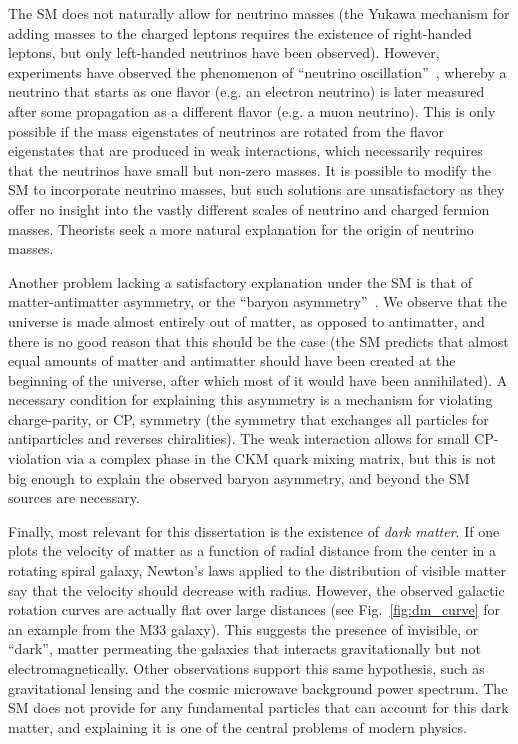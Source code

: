 The SM does not naturally allow for neutrino masses (the Yukawa mechanism for adding masses to the charged leptons
requires the existence of right-handed leptons, but only left-handed neutrinos have been observed). However,
experiments have observed the phenomenon of ``neutrino oscillation''~\cite{PDGreview14}, whereby a neutrino that
starts as one flavor (e.g. an electron neutrino) is later measured after some propagation as a different flavor
(e.g. a muon neutrino). This is only possible if the mass eigenstates of neutrinos are rotated from the flavor
eigenstates that are produced in weak interactions, which necessarily requires that the neutrinos have small
but non-zero masses. It is possible to modify the SM to incorporate neutrino masses, but such solutions are
unsatisfactory as they offer no insight into the vastly different scales of neutrino and charged fermion masses.
Theorists seek a more natural explanation for the origin of neutrino masses.

Another problem lacking a satisfactory explanation under the SM is that of matter-antimatter asymmetry, 
or the ``baryon asymmetry''~\cite{Canetti:baryon_asymm}. 
We observe that the universe is made almost entirely out of matter, as opposed
to antimatter, and there is no good reason that this should be the case (the SM predicts that almost equal amounts
of matter and antimatter should have been created at the beginning of the universe, after which most of it
would have been annihilated). A necessary condition for explaining this asymmetry is a mechanism for violating
charge-parity, or CP, symmetry (the symmetry that exchanges all particles for antiparticles and reverses chiralities).
The weak interaction allows for small CP-violation via a complex phase in the CKM quark mixing matrix, but this
is not big enough to explain the observed baryon asymmetry, and beyond the SM sources are necessary.

Finally, most relevant for this dissertation is the existence of \textit{dark matter}. If one plots the velocity of
matter as a function of radial distance from the center in a rotating spiral galaxy, Newton's laws
applied to the distribution of visible matter say that the velocity should decrease with radius. However, the observed 
galactic rotation curves are actually flat over large distances (see Fig.~\ref{fig:dm_curve} for an example from the M33
galaxy). This suggests the presence of invisible, or ``dark'', matter permeating the galaxies that interacts
gravitationally but not electromagnetically. Other observations support this same hypothesis, such as gravitational
lensing and the cosmic microwave background power spectrum. The SM does not provide for any fundamental particles
that can account for this dark matter, and explaining it is one of the central problems of modern physics.


